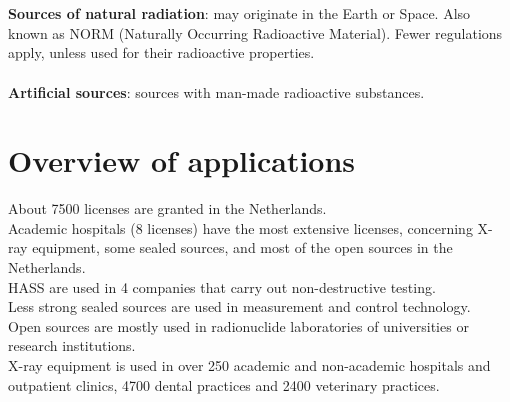 \\\\\textbf{Sources of natural radiation}: may originate in the Earth or Space. Also known as NORM (Naturally Occurring Radioactive Material). Fewer regulations apply, unless used for their radioactive properties.
\\\\\textbf{Artificial sources}: sources with man-made radioactive substances.
\section{Overview of applications}
About 7500 licenses are granted in the Netherlands.\\ 
Academic hospitals (8 licenses) have the most extensive licenses, concerning X-ray equipment, some sealed sources, and most of the open sources in the Netherlands. \\
HASS are used in 4 companies that carry out non-destructive testing. \\
Less strong sealed sources are used in measurement and control technology. \\
Open sources are mostly used in radionuclide laboratories of universities or research institutions. \\
X-ray equipment is used in over 250 academic and non-academic hospitals and outpatient clinics, 4700 dental practices and 2400 veterinary practices. 
